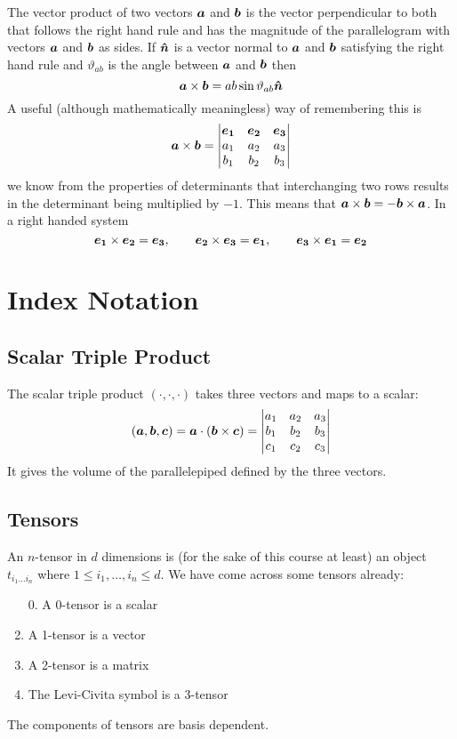 \documentclass{article}
\begin{document}
    The vector product of two vectors \(\bm{a}\) and \(\bm{b}\) is the vector perpendicular to both that follows the right hand rule and has the magnitude of the parallelogram with vectors \(\bm{a}\) and \(\bm{b}\) as sides.
    If \(\bm{\hat{n}}\) is a vector normal to \(\bm{a}\) and \(\bm{b}\) satisfying the right hand rule and \(\vartheta_{ab}\) is the angle between \(\bm{a}\) and \(\bm{b}\) then
    \[\bm{a}\times\bm{b} = ab\sin\vartheta_{ab}\bm{\hat{n}}\]
    A useful (although mathematically meaningless) way of remembering this is
    \[
        \bm{a}\times \bm{b} = 
        \begin{vmatrix}
            \bm{e_{1}} & \bm{e_{2}} & \bm{e_{3}}\\
            a_1 & a_2 & a_3\\
            b_1 & b_2 & b_3
        \end{vmatrix}
    \]
    we know from the properties of determinants that interchanging two rows results in the determinant being multiplied by \(-1\).
    This means that \(\bm{a}\times\bm{b} = -\bm{b}\times \bm{a}\).
    In a right handed system
    \[\bm{e_{1}} \times \bm{e_{2}} = \bm{e_{3}},\qquad \bm{e_{2}}\times \bm{e_{3}} = \bm{e_{1}}, \qquad \bm{e_{3}}\times \bm{e_{1}} = \bm{e_{2}}\]
    
    \section{Index Notation}
    \subsection{Scalar Triple Product}
    The scalar triple product \((\cdot, \cdot, \cdot)\) takes three vectors and maps to a scalar:
    \[
        (\bm{a}, \bm{b}, \bm{c}) = \bm{a}\cdot (\bm{b}\times\bm{c}) = 
        \begin{vmatrix}
            a_1 & a_2 & a_3\\
            b_1 & b_2 & b_3\\
            c_1 & c_2 & c_3
        \end{vmatrix}
    \]
    It gives the volume of the parallelepiped defined by the three vectors.
    
    \subsection{Tensors}
    An \(n\)-tensor in \(d\) dimensions is (for the sake of this course at least) an object \(t_{i_1\dotsc i_n}\) where \(1 \le i_1,\dotsc,i_n\le d\).
    We have come across some tensors already:
    \begin{enumerate}
        \item[0.] A 0-tensor is a scalar
        \item A 1-tensor is a vector
        \item A 2-tensor is a matrix
        \item The Levi-Civita symbol is a 3-tensor
    \end{enumerate}
    The components of tensors are basis dependent.
    
\end{document}
